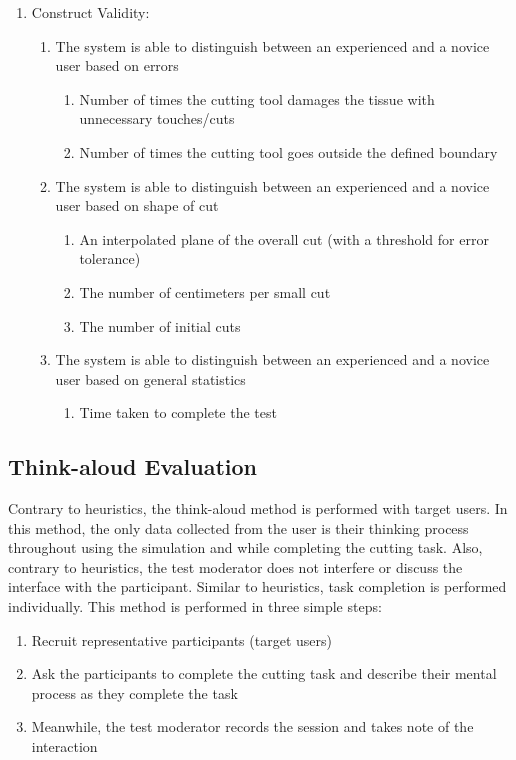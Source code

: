 \begin{enumerate}[1.]
  \item Construct Validity:
	\begin{enumerate}[\em a\em)]
	  \item The system is able to distinguish between an experienced and a novice user based on errors
	  \begin{enumerate}[\em i\em)]
	    \item Number of times the cutting tool damages the tissue with unnecessary touches/cuts
	    \item Number of times the cutting tool goes outside the defined boundary
	  \end{enumerate}
	  \item The system is able to distinguish between an experienced and a novice user based on shape of cut
	  \begin{enumerate}[\em i\em)]
		  \item An interpolated plane of the overall cut (with a threshold for error tolerance)
		  \item The number of centimeters per small cut
		  \item The number of initial cuts
	  \end{enumerate}
	  \item The system is able to distinguish between an experienced and a novice user based on general statistics
	  \begin{enumerate}[\em i\em)]
		  \item Time taken to complete the test
	  \end{enumerate}
  \end{enumerate}
\end{enumerate}

\subsection{Think-aloud Evaluation}
Contrary to heuristics, the think-aloud method is performed with target users. In this method, the only data collected from the user is their thinking process throughout using the simulation and while completing the cutting task. Also, contrary to heuristics, the test moderator does not interfere or discuss the interface with the participant. Similar to heuristics, task completion is performed individually. This method is performed in three simple steps:

\begin{enumerate}[1.]
  \item Recruit representative participants (target users)
  \item Ask the participants to complete the cutting task and describe their mental process as they complete the task
  \item Meanwhile, the test moderator records the session and takes note of the interaction
\end{enumerate}

